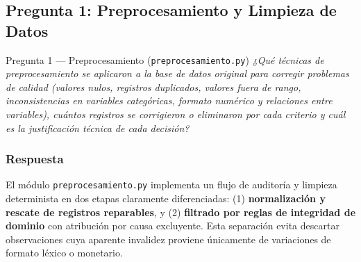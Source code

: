 \documentclass[11pt,a4paper]{article}
\newcommand{\code}[1]{\texttt{\small #1}}
\begin{document}
\subsection{Pregunta 1: Preprocesamiento y Limpieza de Datos}

\begin{pregunta}{Pregunta 1 --- Preprocesamiento (\texttt{preprocesamiento.py})}{}
\textit{¿Qué técnicas de preprocesamiento se aplicaron a la base de datos original para corregir problemas de calidad (valores nulos, registros duplicados, valores fuera de rango, inconsistencias en variables categóricas, formato numérico y relaciones entre variables), cuántos registros se corrigieron o eliminaron por cada criterio y cuál es la justificación técnica de cada decisión?}
\end{pregunta}

\subsubsection*{Respuesta}

El módulo \code{preprocesamiento.py} implementa un flujo de auditoría y limpieza determinista en dos etapas claramente diferenciadas: (1) \textbf{normalización y rescate de registros reparables}, y (2) \textbf{filtrado por reglas de integridad de dominio} con atribución por causa excluyente. Esta separación evita descartar observaciones cuya aparente invalidez proviene únicamente de variaciones de formato léxico o monetario.
\end{document}
